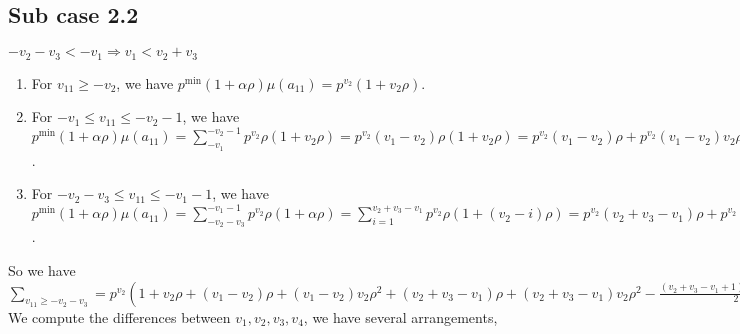 \documentclass{article}
\begin{document}
\subsection{Sub case 2.2}
$-v_2-v_3<{-v_1}\Rightarrow{v_1<{v_2+v_3}}$
\begin{enumerate}
    \item 
For $v_{11}\geq{-v_2}$, we have $p^{\min}(1+\alpha\rho)\mu(a_{11})=p^{v_2}(1+v_2\rho)$.
\item 
For $-v_1\leq{v_{11}}\leq{-v_2-1}$, we have $p^{\min}(1+\alpha\rho)\mu(a_{11})=\sum_{-v_1}^{-v_2-1}p^{v_2}\rho(1+v_2\rho)=p^{v_2}(v_1-v_2)\rho(1+v_2\rho)=p^{v_2}(v_1-v_2)\rho+p^{v_2}(v_1-v_2)v_2\rho^2$.
\item 
For $-v_2-v_3\leq{v_{11}}\leq{-v_1-1}$, we have $p^{\min}(1+\alpha\rho)\mu(a_{11})=\sum_{-v_2-v_3}^{-v_1-1}p^{v_2}\rho(1+\alpha\rho)=\sum_{i=1}^{v_2+v_3-v_1}p^{v_2}\rho(1+(v_2-i)\rho)=p^{v_2}(v_2+v_3-v_1)\rho+p^{v_2}(v_2+v_3-v_1)v_2\rho^2-p^{v_2}\binom{v_2+v_3-v_1+1}{2}\rho^2$.
\end{enumerate}
So we have $\sum_{v_{11}\geq{-v_2-v_3}}=p^{v_2}(1+v_2\rho+(v_1-v_2)\rho+(v_1-v_2)v_2\rho^2+(v_2+v_3-v_1)\rho+(v_2+v_3-v_1)v_2\rho^2-\frac{(v_2+v_3-v_1+1)(v_2+v_3-v_1)}{2}\rho^2)=p^{v_2}(1+v_2\rho+v_3\rho-\frac{v_2^2}{2}\rho^2+\frac{v_2v_1}{2}\rho^2-\frac{v_3^2}{2}\rho^2+\frac{v_3v_1}{2}\rho^2+\frac{v_1v_2}{2}\rho^2+\frac{v_1v_3}{2}\rho^2-\frac{v_1^2}{2}\rho^2-\frac{v_2}{2}\rho^2-\frac{v_3}{2}\rho^2+\frac{v_1}{2}\rho^2)=p^{v_2}(1+v_2\rho+v_3\rho-\frac{v_2^2}{2}\rho^2+v_2v_1\rho^2-\frac{v_3^2}{2}\rho^2+v_3v_1\rho^2-\frac{v_1^2}{2}\rho^2-\frac{v_2}{2}\rho^2-\frac{v_3}{2}\rho^2+\frac{v_1}{2}\rho^2).$
We compute the differences between $v_1,v_2,v_3,v_4$, we have several arrangements,
\end{document}
